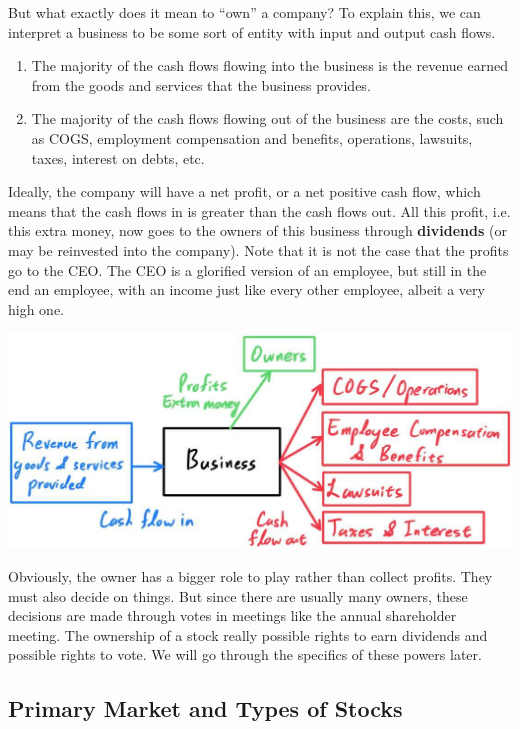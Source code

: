 \documentclass{article}
\begin{document}
    But what exactly does it mean to ``own'' a company? To explain this, we can interpret a business to be some sort of entity with input and output cash flows.
    \begin{enumerate}
      \item The majority of the cash flows flowing into the business is the revenue earned from the goods and services that the business provides. 
      \item The majority of the cash flows flowing out of the business are the costs, such as COGS, employment compensation and benefits, operations, lawsuits, taxes, interest on debts, etc.
    \end{enumerate}
    Ideally, the company will have a net profit, or a net positive cash flow, which means that the cash flows in is greater than the cash flows out. All this profit, i.e. this extra money, now goes to the owners of this business through \textbf{dividends} (or may be reinvested into the company). Note that it is not the case that the profits go to the CEO. The CEO is a glorified version of an employee, but still in the end an employee, with an income just like every other employee, albeit a very high one. 
    \begin{center}
      \includegraphics[scale=0.27]{img/Business_Cash_Flow.jpg}
    \end{center}
    Obviously, the owner has a bigger role to play rather than collect profits. They must also decide on things. But since there are usually many owners, these decisions are made through votes in meetings like the annual shareholder meeting. The ownership of a stock really possible rights to earn dividends and possible rights to vote. We will go through the specifics of these powers later. 

  \subsection{Primary Market and Types of Stocks}
\end{document}
